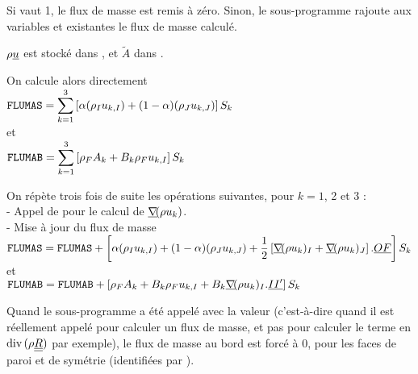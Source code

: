 Si  vaut 1, le flux de masse est remis \`a z\'ero. Sinon, le
sous-programme rajoute aux variables  et  existantes le
flux de masse calcul\'e.


$\rho\underline{u}$ est stock\'e dans , et $\tilde{A}$ dans .


On calcule alors directement\\
$\displaystyle \text{\texttt{FLUMAS}}=\sum\limits_{k=1}^{3}\left[
\alpha(\rho_I u_{k,I})+(1-\alpha)(\rho_J u_{k,J})\right]S_k$\\
et\\
$\displaystyle \text{\texttt{FLUMAB}}=\sum\limits_{k=1}^{3}\left[
\rho_F A_k + B_k\rho_Fu_{k,I}\right]S_k$


On r\'ep\`ete trois fois de suite les op\'erations suivantes, pour $k=1$, 2 et 3
:\\
- Appel de  pour le calcul de $\underline{\nabla}\!(\rho u_k)$.\\
- Mise \`a jour du flux de masse\\
$\displaystyle \text{\texttt{FLUMAS}}=\text{\texttt{FLUMAS}} + \left[
\alpha(\rho_I u_{k,I})+(1-\alpha)(\rho_J u_{k,J})
+\frac{1}{2}\left[\underline{\nabla}\!(\rho u_k)_I+\underline{\nabla}\!(\rho u_k)_J\right]
.\underline{OF}\right]S_k$\\
et\\
$\displaystyle \text{\texttt{FLUMAB}}=\text{\texttt{FLUMAB}}+\left[
\rho_F A_k + B_k\rho_Fu_{k,I}
+B_k\underline{\nabla}\!(\rho u_k)_I.\underline{II^\prime}\right]S_k$


Quand le sous-programme a \'et\'e appel\'e avec la valeur 
(c'est-\`a-dire quand il est r\'eellement appel\'e pour calculer un flux de
masse, et pas pour calculer le terme en $\text{div}\,(\rho\underline{\underline{R}})$ par exemple), le flux
de masse au bord  est forc\'e \`a 0, pour les faces de paroi et de
sym\'etrie (identifi\'ees par ).
